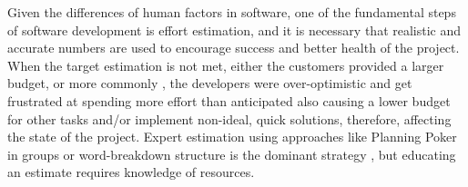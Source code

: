 \documentclass{prrcs}
\begin{document}
Given the differences of human factors in software, one of the fundamental steps of software development is effort estimation, and it is necessary that realistic and accurate numbers are used to encourage success and better health of the project. When the target estimation is not met, either the customers provided a larger budget, or more commonly \cite{molokkenReviewSoftwareSurveys2003,jorgensenBetterSureSafe2004}, the developers were over-optimistic and get frustrated at spending more effort than anticipated also causing a lower budget for other tasks and/or implement non-ideal, quick solutions, therefore, affecting the state of the project. Expert estimation using approaches like Planning Poker \cite{grenningPlanningPokerHow2002} in groups or word-breakdown structure \cite{cicalaDevelopingWorkBreakdown2020} is the dominant strategy \cite{jorgensenReviewStudiesExpert2004}, but educating an estimate requires knowledge of resources.
\end{document}
